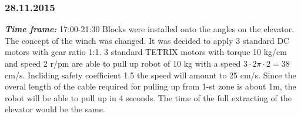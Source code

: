 \subsubsection{28.11.2015}
\textit{\textbf{Time frame:}} 17:00-21:30 \newline
Blocks were installed onto the angles on the elevator.
The concept of the winch was changed. It was decided to apply 3 standard DC motors with gear ratio 1:1. 3 standard TETRIX motors with torque 10 kg/cm and speed 2 r/pm are able to pull up robot of 10 kg with a speed $3 \cdot 2\pi \cdot 2 = 38$ cm/s. Incliding safety coefficient 1.5 the speed will amount to 25 cm/s. Since the overal length of the cable required for pulling up from 1-st zone is about 1m, the robot will be able to pull up in 4 seconds. The time of the full extracting of the elevator would be the same.

